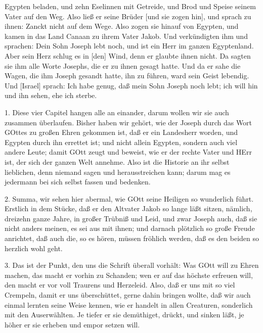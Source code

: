 \begin{schriftzitat}
Egypten beladen, und zehn Eselinnen mit Getreide, und Brod und Speise seinem Vater auf den Weg. Also ließ er seine Brüder [und sie
zogen hin], und sprach zu ihnen: Zanckt nicht auf dem Wege. Also zogen sie hinauf von Egypten, und kamen in das Land Canaan zu ihrem Vater Jakob. Und verkündigten ihm und sprachen: Dein Sohn Joseph lebt noch, und ist ein Herr im ganzen Egyptenland. Aber sein Herz schlug es in [den] Wind, denn er glaubte ihnen nicht. Da sagten sie ihm alle Worte Josephs, die er zu ihnen gesagt hatte. Und da er sahe die Wagen, die ihm Joseph gesandt hatte, ihn zu führen, ward sein Geist lebendig. Und [Israel] sprach: Ich habe genug, daß mein Sohn Joseph noch lebt; ich will hin und ihn sehen, ehe ich sterbe.
\end{schriftzitat}

1. Diese vier Capitel hangen alle an einander, darum wollen wir sie auch zusammen überlaufen. Bisher haben wir gehört, wie der Joseph durch das Wort GOttes zu großen Ehren gekommen ist, daß er ein Landesherr worden, und Egypten durch ihn errettet ist; und nicht allein Egypten, sondern auch viel andere Leute; damit GOtt zeugt und beweist, wie er der rechte Vater und HErr ist, der sich der ganzen Welt annehme. Also ist die Historie an ihr selbst lieblichen, denn niemand sagen und herausstreichen kann; darum mag es jedermann bei sich selbst fassen und bedenken.

2. Summa, wir sehen hier abermal, wie GOtt seine Heiligen so wunderlich führt. Erstlich in dem Stücke, daß er den Altvater Jakob so lange läßt sitzen, nämlich, dreizehn ganze Jahre, in großer Trübniß und Leid, und zwar Joseph auch, daß sie nicht anders meinen, es sei aus mit ihnen; und darnach plötzlich so große Freude anrichtet, daß auch die, so es hören, müssen fröhlich werden, daß es den beiden so herzlich wohl geht.

3. Das ist der Punkt, den uns die Schrift überall vorhält: Was GOtt will zu Ehren machen, das macht er vorhin zu Schanden; wen er auf das höchste erfreuen will, den macht er vor voll Traurens und Herzeleid. Also, daß er uns mit so viel Crempeln, damit er uns überschüttet, gerne dahin bringen wollte, daß wir auch einmal lernten seine Weise kennen, wie er handelt in allen Creaturen, sonderlich mit den Auserwählten. Je tiefer er sie demüthiget, drückt, und sinken läßt, je höher er sie erheben und empor setzen will.

